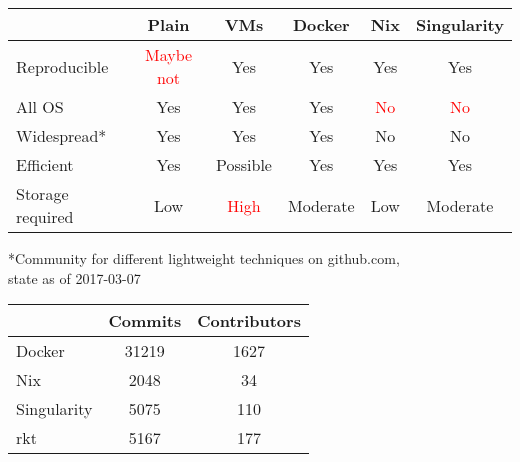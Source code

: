 \documentclass[a4paper, twoside, 11pt]{article}
\begin{document}
\begin{center}
\begin{tabular}{ l | c | c | c | c | c }
\label{tab:summary}
      & Plain 	& VMs 	& Docker 	& Nix 	& Singularity \\
  \hline
  Reproducible & \textcolor{red}{Maybe not} 	& Yes 	& Yes		& Yes	& Yes \\
  \hline
  All OS & Yes 	& Yes 	& Yes		& \textcolor{red}{No}	& \textcolor{red}{No} \\
  \hline
  Widespread* & Yes & Yes & Yes & No & No \\
  \hline
  Efficient & Yes & Possible & Yes & Yes & Yes \\
  \hline
  Storage required & Low & \textcolor{red}{High} & Moderate & Low & Moderate \\
\end{tabular}
\end{center}
\bigskip
\begin{center}
*Community for different lightweight techniques on github.com, \\ state as of 2017-03-07 \\
\bigskip
\begin{tabular}{ l | c | c }
\label{tab:popularity}
      & Commits	& Contributors \\
  \hline
  Docker & 31219 & 1627 \\
  \hline
  Nix & 2048 & 34 \\
  \hline
  Singularity & 5075 & 110 \\
  \hline
  rkt & 5167 & 177 \\
  \hline
\end{tabular} \\
\end{center}



\end{document}
